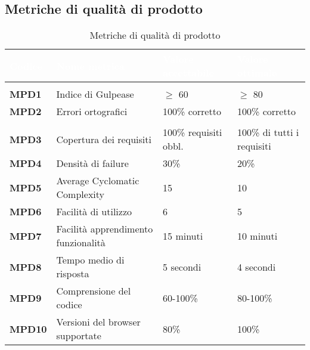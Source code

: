 \newpage

\subsection{Metriche di qualità di prodotto}

\renewcommand{\arraystretch}{1.5}

\begin{longtable}{C{2.5cm} | C{5cm} | C{4cm} | C{4cm}}
\textcolor{white}{\textbf{Codice}}&
\textcolor{white}{\textbf{Nome metrica}}&
\textcolor{white}{\textbf{Valore accettabile}}&
\textcolor{white}{\textbf{Valore ottimale}}\\	
\endhead
\endfoot
{}\caption{Metriche di qualità di prodotto}
\endlastfoot

 \\

	\textbf{MPD1} & Indice di Gulpease & $\geq$ 60 & $\geq$ 80\\
	\textbf{MPD2} & Errori ortografici & 100\% corretto & 100\% corretto \\
	
 \\

	\textbf{MPD3} & Copertura dei requisiti & 100\% requisiti obbl. & 100\% di tutti i requisiti \\
		
	\textbf{MPD4} & Densità di failure & 30\% & 20\% \\

	\textbf{MPD5} & Average Cyclomatic Complexity & 15 & 10 \\		
	\textbf{MPD6} & Facilità di utilizzo & 6 & 5 \\
	\textbf{MPD7} & Facilità apprendimento funzionalità & 15 minuti & 10 minuti\\

 	\textbf{MPD8} & Tempo medio di risposta & 5 secondi & 4 secondi \\
	
 	\textbf{MPD9} & Comprensione del codice & 60-100\% & 80-100\% \\

	\textbf{MPD10} & Versioni del browser supportate & 80\% & 100\% \\
\end{longtable}


	

